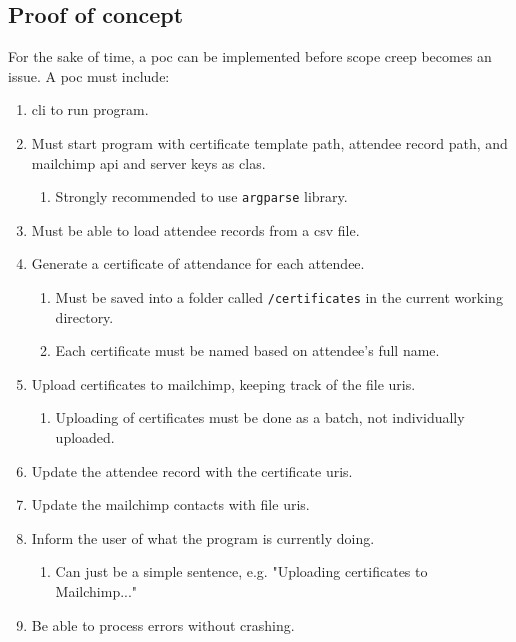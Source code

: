 \documentclass[11pt]{article}
\begin{document}
\subsection{Proof of concept}

For the sake of time, a \gls{poc} can be implemented before scope creep becomes an issue. A \gls{poc} must include:

\begin{enumerate}
    \item \Gls{cli} to run program.
    \item Must start program with certificate template \gls{path}, attendee record \gls{path}, and \Gls{mailchimp} \acrshort{api} and \gls{server} keys as \glspl{cla}.
    \begin{enumerate}
        \item Strongly recommended to use \texttt{argparse} \gls{library}.
    \end{enumerate}
    \item Must be able to load attendee records from a \acrshort{csv} file.
    \item Generate a certificate of attendance for each attendee.
    \begin{enumerate}
        \item Must be saved into a folder called \texttt{/certificates} in the current working directory.
        \item Each certificate must be named based on attendee's full name.
    \end{enumerate}
    \item Upload certificates to \Gls{mailchimp}, keeping track of the file \acrshort{uri}s.
    \begin{enumerate}
        \item Uploading of certificates must be done as a \gls{batch}, not individually uploaded.
    \end{enumerate}
    \item Update the attendee record with the certificate \acrshort{uri}s.
    \item Update the \Gls{mailchimp} contacts with file \acrshort{uri}s.
    \item Inform the \gls{user} of what the program is currently doing.
    \begin{enumerate}
        \item Can just be a simple sentence, e.g. "Uploading certificates to Mailchimp..."
    \end{enumerate}
    \item Be able to process errors without crashing.

\end{enumerate}
\end{document}

